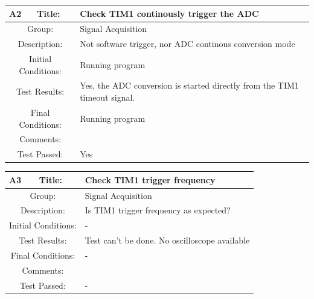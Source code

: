 \documentclass[12pt]{article}
\begin{document}
		\begin{table}[H]
			\begin{center}
				\begin{tabular}{| m{2cm}|m{2cm}|m{12cm}|}
					\hline 
					\bf A2&\bf Title:&\bf Check TIM1 continously trigger the ADC\\ 
					\hline 
					\multicolumn{2}{|c|}{Group:}&Signal Acquisition\\ 
					\hline 
					\multicolumn{2}{|c|}{Description:}&Not software trigger, nor ADC continous conversion mode\\ 
					\hline 
					\multicolumn{2}{|c|}{Initial Conditions:}&Running program\\ 
					\hline 
					\multicolumn{2}{|c|}{Test Results:}&Yes, the ADC conversion is started directly from the TIM1 timeout signal.\\ 
					\hline 
					\multicolumn{2}{|c|}{Final Conditions:}&Running program\\ 
					\hline 
					\multicolumn{2}{|c|}{Comments:}&\\ 
					\hline 
					\multicolumn{2}{|c|}{Test Passed:}&Yes\\ 
					\hline 
				\end{tabular} 
			\end{center}
		\end{table}	
	
			\begin{table}[H]
		\begin{center}
			\begin{tabular}{| m{2cm}|m{2cm}|m{12cm}|}
				\hline 
				\bf A3&\bf Title:&\bf Check TIM1 trigger frequency\\ 
				\hline 
				\multicolumn{2}{|c|}{Group:}&Signal Acquisition\\ 
				\hline 
				\multicolumn{2}{|c|}{Description:}&Is TIM1 trigger frequency as expected?\\ 
				\hline 
				\multicolumn{2}{|c|}{Initial Conditions:}&-\\ 
				\hline 
				\multicolumn{2}{|c|}{Test Results:}&Test can't be done. No oscilloscope available\\ 
				\hline 
				\multicolumn{2}{|c|}{Final Conditions:}&-\\ 
				\hline 
				\multicolumn{2}{|c|}{Comments:}&\\ 
				\hline 
				\multicolumn{2}{|c|}{Test Passed:}&-\\ 
				\hline 
			\end{tabular} 
		\end{center}
	\end{table}	
	
\end{document}
